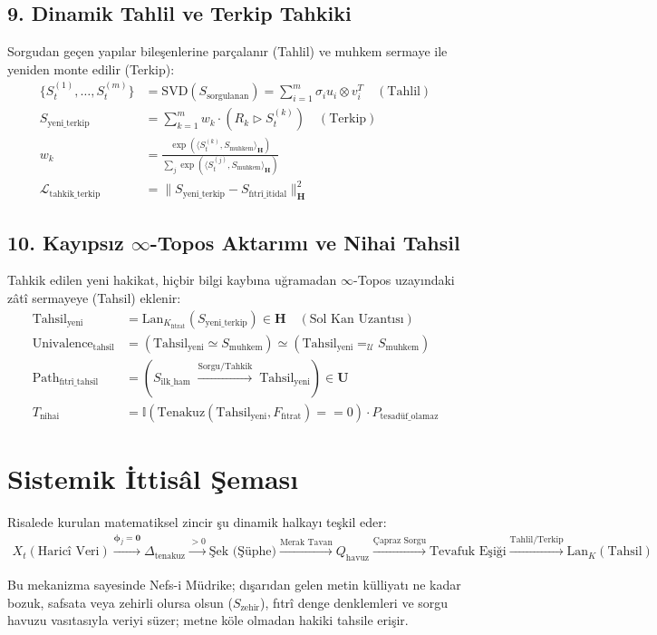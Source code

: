 \documentclass[11pt, a4paper]{article}
\begin{document}
\subsection{9. Dinamik Tahlil ve Terkip Tahkiki}
Sorgudan geçen yapılar bileşenlerine parçalanır (Tahlil) ve muhkem sermaye ile yeniden monte edilir (Terkip):
\begin{align}
\{ S_t^{(1)}, \dots, S_t^{(m)} \} &= \text{SVD}(S_{\text{sorgulanan}}) = \sum_{i=1}^m \sigma_i u_i \otimes v_i^T \quad (\text{Tahlil}) \\
S_{\text{yeni\_terkip}} &= \sum_{k=1}^m w_k \cdot \left( R_k \triangleright S_t^{(k)} \right) \quad (\text{Terkip}) \\
w_k &= \frac{\exp\left( \langle S_t^{(k)}, S_{\text{muhkem}} \rangle_{\mathbf{H}} \right)}{\sum_j \exp\left( \langle S_t^{(j)}, S_{\text{muhkem}} \rangle_{\mathbf{H}} \right)} \\
\mathcal{L}_{\text{tahkik\_terkip}} &= \| S_{\text{yeni\_terkip}} - S_{\text{fıtrî\_itidal}} \|_{\mathbf{H}}^2
\end{align}

\subsection{10. Kayıpsız $\infty$-Topos Aktarımı ve Nihai Tahsil}
Tahkik edilen yeni hakikat, hiçbir bilgi kaybına uğramadan $\infty$-Topos uzayındaki zâtî sermayeye (Tahsil) eklenir:
\begin{align}
\text{Tahsil}_{\text{yeni}} &= \text{Lan}_{K_{\text{fıtrat}}}\left( S_{\text{yeni\_terkip}} \right) \in \mathbf{H} \quad (\text{Sol Kan Uzantısı}) \\
\text{Univalence}_{\text{tahsil}} &= \left( \text{Tahsil}_{\text{yeni}} \simeq S_{\text{muhkem}} \right) \simeq \left( \text{Tahsil}_{\text{yeni}} =_{\mathcal{U}} S_{\text{muhkem}} \right) \\
\text{Path}_{\text{fıtrî\_tahsil}} &= \left( S_{\text{ilk\_ham}} \; \xrightarrow{\text{Sorgu/Tahkik}} \; \text{Tahsil}_{\text{yeni}} \right) \in \mathbf{U} \\
T_{\text{nihai}} &= \mathbb{I}\left( \text{Tenakuz}(\text{Tahsil}_{\text{yeni}}, F_{\text{fıtrat}}) == 0 \right) \cdot P_{\text{tesadüf\_olamaz}}
\end{align}

\section{Sistemik İttisâl Şeması}

Risalede kurulan matematiksel zincir şu dinamik halkayı teşkil eder:
\begin{align*}
X_t (\text{Haricî Veri}) \xrightarrow{\bm{\phi}_j=\mathbf{0}} \Delta_{\text{tenakuz}} \xrightarrow{>0} \text{Şek (Şüphe)} \xrightarrow{\text{Merak Tavan}} Q_{\text{havuz}} \xrightarrow{\text{Çapraz Sorgu}} \text{Tevafuk Eşiği} \xrightarrow{\text{Tahlil/Terkip}} \text{Lan}_K (\text{Tahsil})
\end{align*}

Bu mekanizma sayesinde Nefs-i Müdrike; dışarıdan gelen metin külliyatı ne kadar bozuk, safsata veya zehirli olursa olsun ($S_{\text{zehir}}$), fıtrî denge denklemleri ve sorgu havuzu vasıtasıyla veriyi süzer; metne köle olmadan hakiki tahsile erişir.
\end{document}
